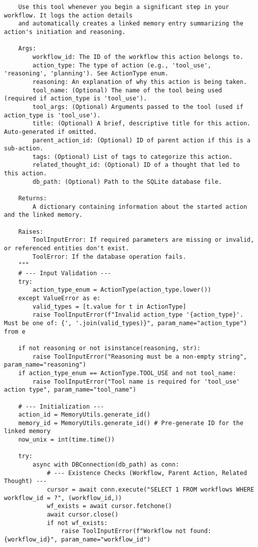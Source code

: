 \documentclass[12pt,a4paper]{article}
\begin{document}
\begin{pageablecode}
\begin{verbatim}
    Use this tool whenever you begin a significant step in your workflow. It logs the action details
    and automatically creates a linked memory entry summarizing the action's initiation and reasoning.

    Args:
        workflow_id: The ID of the workflow this action belongs to.
        action_type: The type of action (e.g., 'tool_use', 'reasoning', 'planning'). See ActionType enum.
        reasoning: An explanation of why this action is being taken.
        tool_name: (Optional) The name of the tool being used (required if action_type is 'tool_use').
        tool_args: (Optional) Arguments passed to the tool (used if action_type is 'tool_use').
        title: (Optional) A brief, descriptive title for this action. Auto-generated if omitted.
        parent_action_id: (Optional) ID of parent action if this is a sub-action.
        tags: (Optional) List of tags to categorize this action.
        related_thought_id: (Optional) ID of a thought that led to this action.
        db_path: (Optional) Path to the SQLite database file.

    Returns:
        A dictionary containing information about the started action and the linked memory.

    Raises:
        ToolInputError: If required parameters are missing or invalid, or referenced entities don't exist.
        ToolError: If the database operation fails.
    """
    # --- Input Validation ---
    try:
        action_type_enum = ActionType(action_type.lower())
    except ValueError as e:
        valid_types = [t.value for t in ActionType]
        raise ToolInputError(f"Invalid action_type '{action_type}'. Must be one of: {', '.join(valid_types)}", param_name="action_type") from e

    if not reasoning or not isinstance(reasoning, str):
        raise ToolInputError("Reasoning must be a non-empty string", param_name="reasoning")
    if action_type_enum == ActionType.TOOL_USE and not tool_name:
        raise ToolInputError("Tool name is required for 'tool_use' action type", param_name="tool_name")

    # --- Initialization ---
    action_id = MemoryUtils.generate_id()
    memory_id = MemoryUtils.generate_id() # Pre-generate ID for the linked memory
    now_unix = int(time.time()) 

    try:
        async with DBConnection(db_path) as conn:
            # --- Existence Checks (Workflow, Parent Action, Related Thought) ---
            cursor = await conn.execute("SELECT 1 FROM workflows WHERE workflow_id = ?", (workflow_id,))
            wf_exists = await cursor.fetchone()
            await cursor.close()
            if not wf_exists:
                raise ToolInputError(f"Workflow not found: {workflow_id}", param_name="workflow_id")


\end{verbatim}
\end{pageablecode}
\end{document}
